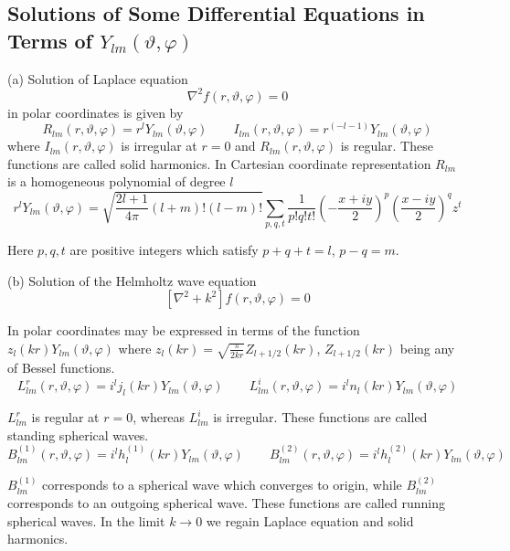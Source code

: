 \subsection[Solutions of Some ...]{Solutions of Some Differential Equations in Terms of $Y_{lm}(\vartheta,\varphi)$}
\par{(a) Solution of Laplace equation}
\begin{equation}
\nabla^2f(r,\vartheta,\varphi)=0
\end{equation}
in polar coordinates is given by
\begin{equation}
R_{lm}(r,\vartheta,\varphi)=r^lY_{lm}(\vartheta,\varphi)\qquad I_{lm}(r,\vartheta,\varphi)=r^{(-l-1)}Y_{lm}(\vartheta,\varphi) 
\end{equation}
where $I_{lm}(r,\vartheta,\varphi)$ is irregular at $r=0$ and
$R_{lm}(r,\vartheta,\varphi)$ is regular. These functions are called solid
harmonics. In Cartesian coordinate representation $R_{lm}$ is a homogeneous
polynomial of degree $l$
\begin{equation}
r^lY_{lm}(\vartheta,\varphi)=\sqrt{\frac{2l+1}{4\pi}(l+m)!(l-m)!}\sum_{p,q,t}\frac{1}{p!q!t!}\left(-\frac{x+iy}{2}\right)^p\left(\frac{x-iy}{2}\right)^qz^t
\end{equation}
\par{Here $p,q,t$ are positive integers which satisfy $p+q+t=l$, $p-q=m$.}
\par{(b) Solution of the Helmholtz wave equation}
\begin{equation}
\left[\nabla^2+k^2\right]f(r,\vartheta,\varphi)=0
\end{equation}
\par{In polar coordinates may be expressed in terms of the function
$z_l(kr)Y_{lm}(\vartheta,\varphi)$ where
$z_l(kr)=\sqrt{\frac{\pi}{2kr}}Z_{l+1/2}(kr)$, $Z_{l+1/2}(kr)$ being any of
Bessel functions.}
\begin{equation}
L_{lm}^{r}(r,\vartheta,\varphi)=i^lj_l(kr)Y_{lm}(\vartheta,\varphi)\qquad L_{lm}^{i}(r,\vartheta,\varphi)=i^ln_l(kr)Y_{lm}(\vartheta,\varphi) 
\end{equation}
\par{$L_{lm}^{r}$ is regular at $r=0$, whereas $L_{lm}^{i}$ is irregular. These
functions are called standing spherical waves.}
\begin{equation}
B_{lm}^{(1)}(r,\vartheta,\varphi)=i^lh_l^{(1)}(kr)Y_{lm}(\vartheta,\varphi)\qquad B_{lm}^{(2)}(r,\vartheta,\varphi)=i^lh_l^{(2)}(kr)Y_{lm}(\vartheta,\varphi) 
\end{equation}
\par {$B_{lm}^{(1)}$ corresponds to a spherical wave which converges to origin, while
$B_{lm}^{(2)}$ corresponds to an outgoing spherical wave. These functions are
called running spherical waves. In the limit $k \rightarrow 0$ we regain
Laplace equation and solid harmonics.}
